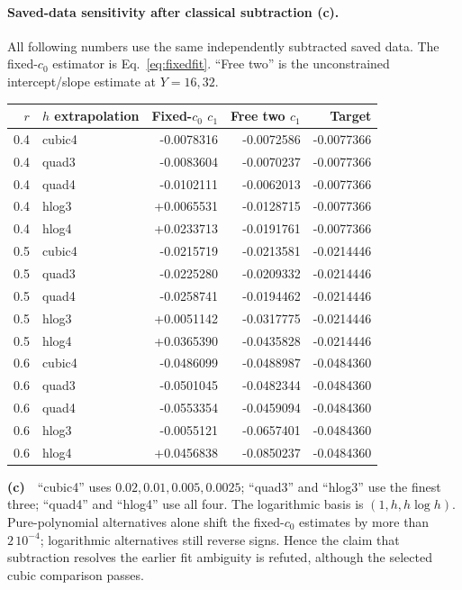 \documentclass[11pt,a4paper]{article}
\newcommand{\Lc}{\textbf{(c)}\ }
\begin{document}
\paragraph{Saved-data sensitivity after classical subtraction (c).}
All following numbers use the same independently subtracted saved data.
The fixed-$c_0$ estimator is Eq.~\eqref{eq:fixedfit}. ``Free two'' is the
unconstrained intercept/slope estimate at $Y=16,32$.
\begin{center}\small
\begin{tabular}{rlrrr}\toprule
$r$ & $h$ extrapolation & Fixed-$c_0$ $c_1$ & Free two $c_1$ & Target\\\midrule
0.4 & cubic4 & -0.0078316 & -0.0072586 & -0.0077366\\
0.4 & quad3 & -0.0083604 & -0.0070237 & -0.0077366\\
0.4 & quad4 & -0.0102111 & -0.0062013 & -0.0077366\\
0.4 & hlog3 & +0.0065531 & -0.0128715 & -0.0077366\\
0.4 & hlog4 & +0.0233713 & -0.0191761 & -0.0077366\\
0.5 & cubic4 & -0.0215719 & -0.0213581 & -0.0214446\\
0.5 & quad3 & -0.0225280 & -0.0209332 & -0.0214446\\
0.5 & quad4 & -0.0258741 & -0.0194462 & -0.0214446\\
0.5 & hlog3 & +0.0051142 & -0.0317775 & -0.0214446\\
0.5 & hlog4 & +0.0365390 & -0.0435828 & -0.0214446\\
0.6 & cubic4 & -0.0486099 & -0.0488987 & -0.0484360\\
0.6 & quad3 & -0.0501045 & -0.0482344 & -0.0484360\\
0.6 & quad4 & -0.0553354 & -0.0459094 & -0.0484360\\
0.6 & hlog3 & -0.0055121 & -0.0657401 & -0.0484360\\
0.6 & hlog4 & +0.0456838 & -0.0850237 & -0.0484360\\
\bottomrule\end{tabular}\end{center}
\Lc\ ``cubic4'' uses $0.02,0.01,0.005,0.0025$; ``quad3'' and ``hlog3''
use the finest three; ``quad4'' and ``hlog4'' use all four. The logarithmic
basis is $(1,h,h\log h)$. Pure-polynomial alternatives alone shift the
fixed-$c_0$ estimates by more than $2\,10^{-4}$; logarithmic alternatives
still reverse signs. Hence the claim that subtraction resolves the earlier
fit ambiguity is refuted, although the selected cubic comparison passes.
\end{document}

